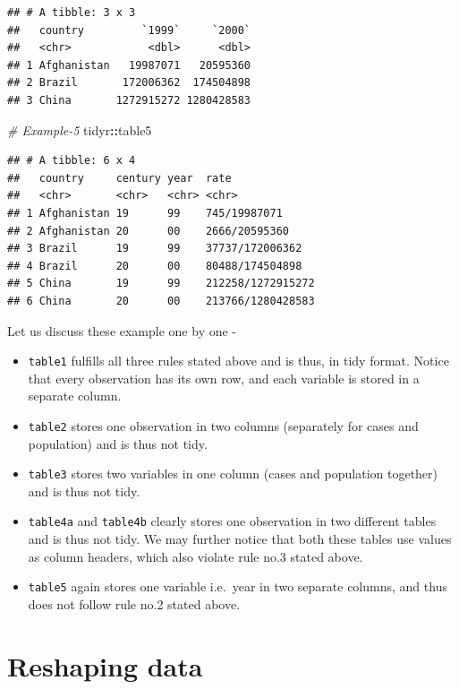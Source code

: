 \documentclass[
]{book}
\newenvironment{Shaded}{\begin{snugshade}}{\end{snugshade}}
\newcommand{\CommentTok}[1]{\textcolor[rgb]{0.56,0.35,0.01}{\textit{#1}}}
\newcommand{\NormalTok}[1]{#1}
\newcommand{\SpecialCharTok}[1]{\textcolor[rgb]{0.81,0.36,0.00}{\textbf{#1}}}
\providecommand{\tightlist}{%
  \setlength{\itemsep}{0pt}\setlength{\parskip}{0pt}}
\begin{document}
\begin{verbatim}
## # A tibble: 3 x 3
##   country         `1999`     `2000`
##   <chr>            <dbl>      <dbl>
## 1 Afghanistan   19987071   20595360
## 2 Brazil       172006362  174504898
## 3 China       1272915272 1280428583
\end{verbatim}

\begin{Shaded}
\begin{Highlighting}[]
\CommentTok{\# Example{-}5}
\NormalTok{tidyr}\SpecialCharTok{::}\NormalTok{table5}
\end{Highlighting}
\end{Shaded}

\begin{verbatim}
## # A tibble: 6 x 4
##   country     century year  rate             
##   <chr>       <chr>   <chr> <chr>            
## 1 Afghanistan 19      99    745/19987071     
## 2 Afghanistan 20      00    2666/20595360    
## 3 Brazil      19      99    37737/172006362  
## 4 Brazil      20      00    80488/174504898  
## 5 China       19      99    212258/1272915272
## 6 China       20      00    213766/1280428583
\end{verbatim}

Let us discuss these example one by one -

\begin{itemize}
\tightlist
\item
  \texttt{table1} fulfills all three rules stated above and is thus, in tidy format. Notice that every observation has its own row, and each variable is stored in a separate column.
\item
  \texttt{table2} stores one observation in two columns (separately for cases and population) and is thus not tidy.
\item
  \texttt{table3} stores two variables in one column (cases and population together) and is thus not tidy.
\item
  \texttt{table4a} and \texttt{table4b} clearly stores one observation in two different tables and is thus not tidy. We may further notice that both these tables use values as column headers, which also violate rule no.3 stated above.
\item
  \texttt{table5} again stores one variable i.e.~year in two separate columns, and thus does not follow rule no.2 stated above.
\end{itemize}

\hypertarget{reshaping-data}{%
\section{Reshaping data}\label{reshaping-data}}
\end{document}
